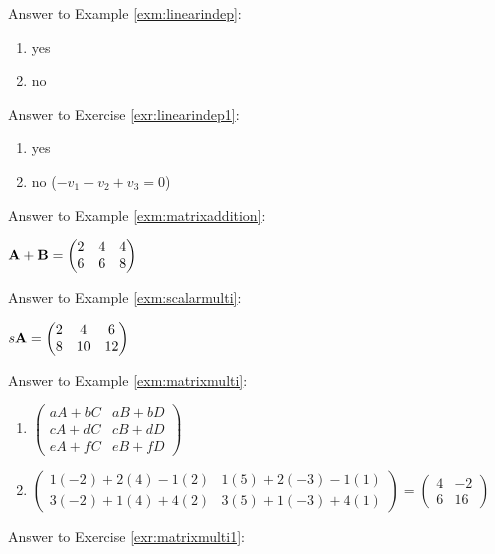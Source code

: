 \documentclass[
]{book}
\providecommand{\tightlist}{%
  \setlength{\itemsep}{0pt}\setlength{\parskip}{0pt}}
\theoremstyle{definition}
\theoremstyle{definition}
\theoremstyle{definition}
\theoremstyle{remark}
\begin{document}
Answer to Example \ref{exm:linearindep}:

\begin{enumerate}
\def\labelenumi{\arabic{enumi}.}
\tightlist
\item
  yes
\item
  no
\end{enumerate}

Answer to Exercise \ref{exr:linearindep1}:

\begin{enumerate}
\def\labelenumi{\arabic{enumi}.}
\tightlist
\item
  yes
\item
  no (\(-v_1 -v_2 + v_3 = 0\))
\end{enumerate}

Answer to Example \ref{exm:matrixaddition}:

\({\bf A+B}=\begin{pmatrix} 2 & 4 & 4 \\ 6 & 6 & 8 \end{pmatrix}\)

Answer to Example \ref{exm:scalarmulti}:

\(s {\bf A} = \begin{pmatrix} 2 & 4 & 6 \\ 8 & 10 & 12 \end{pmatrix}\)

Answer to Example \ref{exm:matrixmulti}:

\begin{enumerate}
\def\labelenumi{\arabic{enumi}.}
\item
  \(\begin{pmatrix} aA+bC&aB+bD\\cA+dC&cB+dD\\eA+fC&eB+fD \end{pmatrix}\)
\item
  \(\begin{pmatrix} 1(-2)+2(4)-1(2)&1(5)+2(-3)-1(1)\\  3(-2)+1(4)+4(2)&3(5)+1(-3)+4(1)\end{pmatrix} =  \begin{pmatrix} 4&-2\\6&16\end{pmatrix}\)
\end{enumerate}

Answer to Exercise \ref{exr:matrixmulti1}:
\end{document}

